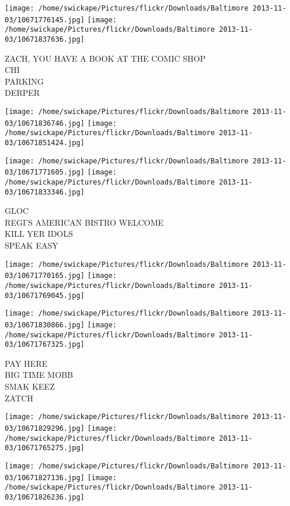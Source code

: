 \documentclass[10pt,letterpaper]{article}
\begin{document}
\texttt{[image: /home/swickape/Pictures/flickr/Downloads/Baltimore 2013-11-03/10671776145.jpg]}
\texttt{[image: /home/swickape/Pictures/flickr/Downloads/Baltimore 2013-11-03/10671837636.jpg]}

ZACH, YOU HAVE A BOOK AT THE COMIC SHOP\\
CHI\\
PARKING\\
DERPER\\
\pagebreak

\texttt{[image: /home/swickape/Pictures/flickr/Downloads/Baltimore 2013-11-03/10671836746.jpg]}
\texttt{[image: /home/swickape/Pictures/flickr/Downloads/Baltimore 2013-11-03/10671851424.jpg]}

\texttt{[image: /home/swickape/Pictures/flickr/Downloads/Baltimore 2013-11-03/10671771605.jpg]}
\texttt{[image: /home/swickape/Pictures/flickr/Downloads/Baltimore 2013-11-03/10671833346.jpg]}

GLOC\\
REGI'S AMERICAN BISTRO WELCOME\\
KILL YER IDOLS\\
SPEAK EASY\\
\pagebreak

\texttt{[image: /home/swickape/Pictures/flickr/Downloads/Baltimore 2013-11-03/10671770165.jpg]}
\texttt{[image: /home/swickape/Pictures/flickr/Downloads/Baltimore 2013-11-03/10671769045.jpg]}

\texttt{[image: /home/swickape/Pictures/flickr/Downloads/Baltimore 2013-11-03/10671830866.jpg]}
\texttt{[image: /home/swickape/Pictures/flickr/Downloads/Baltimore 2013-11-03/10671767325.jpg]}

PAY HERE\\
BIG TIME MOBB\\
SMAK KEEZ\\
ZATCH\\
\pagebreak

\texttt{[image: /home/swickape/Pictures/flickr/Downloads/Baltimore 2013-11-03/10671829296.jpg]}
\texttt{[image: /home/swickape/Pictures/flickr/Downloads/Baltimore 2013-11-03/10671765275.jpg]}

\texttt{[image: /home/swickape/Pictures/flickr/Downloads/Baltimore 2013-11-03/10671827136.jpg]}
\texttt{[image: /home/swickape/Pictures/flickr/Downloads/Baltimore 2013-11-03/10671826236.jpg]}
\end{document}
